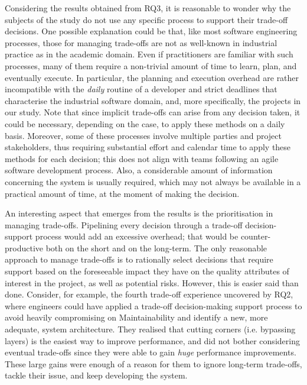 Considering the results obtained from RQ3, it is reasonable to wonder why the subjects of the study do not use any specific process to support their trade-off decisions.
One possible explanation could be that, like most software engineering processes, those for managing trade-offs are not as well-known in industrial practice as in the academic domain.
Even if practitioners are familiar with such processes, many of them require a non-trivial amount of time to learn, plan, and eventually execute.
In particular, the planning and execution overhead are rather incompatible with the \textit{daily} routine of a developer and strict deadlines that characterise the industrial software domain, and, more specifically, the projects in our study. 
Note that since implicit trade-offs can arise from any decision taken, it could be necessary, depending on the case, to apply these methods on a daily basis.
Moreover, some of these processes involve multiple parties and project stakeholders, thus requiring substantial effort and calendar time to apply these methods for each decision; this does not align with teams following an agile software development process.
Also, a considerable amount of information concerning the system is usually required, which may not always be available in a practical amount of time, at the moment of making the decision.

An interesting aspect that emerges from the results is the prioritisation in managing trade-offs. Pipelining every decision through a trade-off decision-support process would add an excessive overhead; that would be counter-productive both on the short and on the long-term.
The only reasonable approach to manage trade-offs is to rationally select decisions that require support based on the foreseeable impact they have on the quality attributes of interest in the project, as well as potential risks. 
However, this is easier said than done.
Consider, for example, the fourth trade-off experience uncovered by RQ2, where engineers could have applied a trade-off decision-making support process to avoid heavily compromising on Maintainability and identify a new, more adequate, system architecture. 
They realised that cutting corners (i.e. bypassing layers) is the easiest way to improve performance, and did not bother considering eventual trade-offs since they were able to gain \textit{huge} performance improvements.
These large gains were enough of a reason for them to ignore long-term trade-offs, tackle their issue, and keep developing the system.

